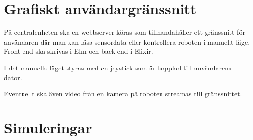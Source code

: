 \documentclass[a4paper,titlepage,12pt]{article}
\begin{document}
	\section{Grafiskt användargränssnitt}
    
    På centralenheten ska en webbserver köras som tillhandahåller ett gränssnitt
    för användaren där man kan läsa sensordata eller kontrollera roboten i
    manuellt läge. Front-end ska skrivas i Elm och back-end i Elixir.

    I det manuella läget styras med en joystick som är kopplad till användarens
    dator.
    
    Eventuellt ska även video från en kamera på roboten streamas till gränssnittet.
    

	\section{Simuleringar}
    
\end{document}
